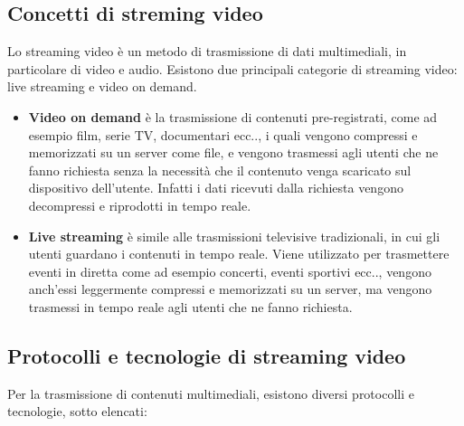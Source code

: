 \subsection{Concetti di streming video}
Lo streaming video è un metodo di trasmissione di dati multimediali, in particolare di video e audio.
Esistono due principali categorie di streaming video: live streaming e video on demand.\\
\begin{itemize}
    \item \textbf{Video on demand} è la trasmissione di contenuti pre-registrati, come ad esempio film, serie TV, documentari ecc.., i quali vengono compressi e memorizzati su un server come file,
    e vengono trasmessi agli utenti che ne fanno richiesta senza la necessità che il contenuto venga scaricato sul dispositivo dell'utente. Infatti i dati ricevuti dalla richiesta vengono decompressi e riprodotti in tempo reale.
    \item \textbf{Live streaming} è simile alle trasmissioni televisive tradizionali, in cui gli utenti guardano i contenuti in tempo reale. Viene utilizzato per trasmettere eventi in 
    diretta come ad esempio concerti, eventi sportivi ecc.., vengono anch'essi leggermente compressi e memorizzati su un server, ma vengono trasmessi in tempo reale agli utenti che ne fanno richiesta.
    \end{itemize}
\subsection{Protocolli e tecnologie di streaming video}
Per la trasmissione di contenuti multimediali, esistono diversi protocolli e tecnologie, sotto elencati:

